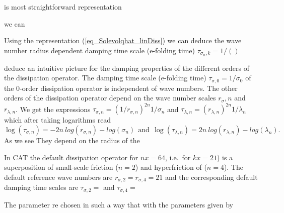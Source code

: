 is most straightforward
representation 

we can

Using the representation (\ref{eq_Solevolqhat_linDiss}) we can
deduce the wave number radius dependent damping time scale (e-folding time)
$\tau_{\sigma_{n},k} = 1/()$

  deduce an intuitive picture 
for the damping properties of the different orders of the dissipation operator. 
The damping time scale (e-folding time) $\tau_{\sigma,0} = 1/\sigma_{0}$
of the $0$-order dissipation operator is independent of wave numbers. The 
other orders of the dissipation operator depend on the wave number scales 
$r_{\sigma},n$ and $r_{\lambda,n}$. We get the expressions
$\tau_{\sigma,n} = (1/r_{\sigma,n})^{2n} 1/\sigma_{n}$ and 
$\tau_{\lambda,n} = (r_{\lambda,n})^{2n} 1/\lambda_{n}$ which
after taking logarithms read 
\begin{equation}
  \log(\tau_{\sigma,n}) = -2n \ log(r_{\sigma,n}) - log(\sigma_{n})
  \ \ \mbox{and} \ \ 
  \log(\tau_{\lambda,n}) = 2n \ log(r_{\lambda,n}) - log(\lambda_{n}).
\end{equation}
As we see They depend on the radius of the 

In CAT the default dissipation operator for $nx = 64$, i.e.\ for $kx = 21$) 
is a superposition of small-scale friction ($n=2$) and hyperfriction 
of ($n=4$). The default reference wave numbers are 
$r_{\sigma,2} = r_{\sigma,4} = 21$ and the corresponding default 
damping time scales are $\tau_{\sigma,2} = $ and  $\tau_{\sigma,4} = $

  The parameter re chosen
in such a way that with the parameters     given by  


